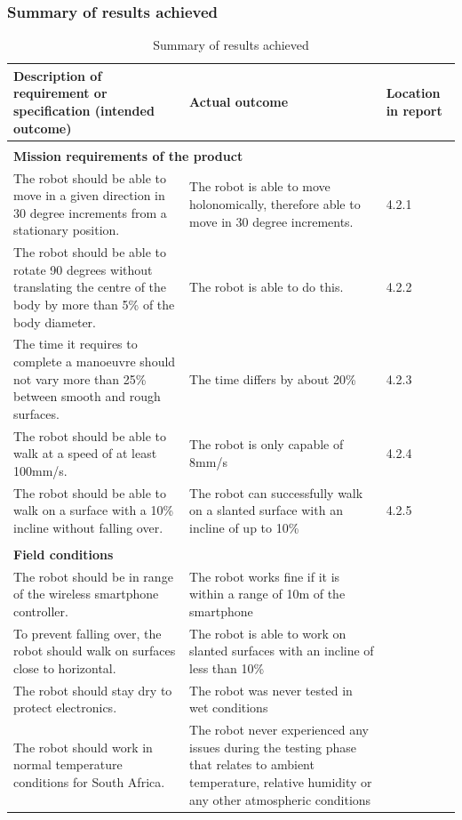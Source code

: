 
\subsubsection{Summary of results achieved}
\begin{table}[H]
\begin{tabular}{|p{5cm}|p{5cm}|p{5cm}|}
\hline
\textbf{Description of requirement or specification
(intended outcome)} & \textbf{Actual outcome}& \textbf{Location in report}\\
\hline
\multicolumn{3}{|l|}{}\\
\multicolumn{3}{|l|}{\textbf{Mission requirements of the product}}\\
\hline

The robot should be able to move in a given direction in 30 degree increments from a stationary position. & The robot is able to move holonomically, therefore able to move in 30 degree increments.&4.2.1\\\hline

The robot should be able to rotate 90 degrees without translating the centre of the body by more than 5\% of the body diameter.&The robot is able to do this.&4.2.2\\\hline

The time it requires to complete a manoeuvre should not vary more than 25\% between smooth and rough surfaces.&The time differs by about 20\%&4.2.3\\\hline

The robot should be able to walk at a speed of at least 100mm/s.&The robot is only capable of 8mm/s&4.2.4\\\hline

The robot should be able to walk on a surface with a 10\% incline without falling over.&The robot can successfully walk on a slanted surface with an incline of up to 10\% &4.2.5\\\hline

\multicolumn{3}{|l|}{}\\
\multicolumn{3}{|l|}{\textbf{Field conditions}}\\
\hline
The robot should be in range of the wireless smartphone controller.&The robot works fine if it is within a range of 10m of the smartphone&\\\hline

To prevent falling over, the robot should walk on surfaces close to horizontal.&The robot is able to work on slanted surfaces with an incline of less than 10\%&\\\hline

The robot should stay dry to protect electronics.&The robot was never tested in wet conditions&\\\hline

The robot should work in normal temperature conditions for South Africa.&The robot never experienced any issues during the testing phase that relates to ambient temperature, relative humidity or any other atmospheric conditions&\\\hline

\end{tabular}
\caption{Summary of results achieved}
\label{tab:sum}
\end{table}

